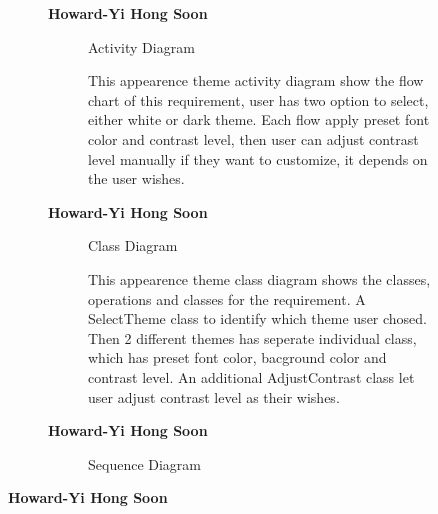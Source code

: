 \documentclass{article}
\begin{document}
		\begin{figure}[htbp]
			\textbf{Howard-Yi Hong Soon}
			\centering
			\begin{subfigure}{\textwidth}
				\resizebox{\textwidth}{!}{}
				\caption{Activity Diagram}
			\end{subfigure}
			\begin{subfigure}{\textwidth}
				This appearence theme activity diagram show the flow chart of this requirement, user has two option to select, either white or dark theme.
				Each flow apply preset font color and contrast level, then user can adjust contrast level manually if they want to customize, it depends on the 
				user wishes.
			\end{subfigure}
		\end{figure}
		

		\begin{figure}[htbp]
			\textbf{Howard-Yi Hong Soon}
			\centering
			\begin{subfigure}{\textwidth}
				\resizebox{\textwidth}{!}{}
				\caption{Class Diagram}
			\end{subfigure}
			\begin{subfigure}{\textwidth}
				This appearence theme class diagram shows the classes, operations and classes for the requirement. A SelectTheme class to identify
				which theme user chosed. Then 2 different themes has seperate individual class, which has preset font color, bacground color and 
				contrast level. An additional AdjustContrast class let user adjust contrast level as their wishes.
			\end{subfigure}
		\end{figure}
		

		\begin{figure}[htbp]
			\textbf{Howard-Yi Hong Soon}
			\centering
			\begin{subfigure}{\textwidth}
				\resizebox{\textwidth}{!}{}
				\caption{Sequence Diagram}
			\end{subfigure}
			\begin{subfigure}{\textwidth}
			\end{subfigure}
		\end{figure}
		\newpage

		\textbf{Howard-Yi Hong Soon}
\end{document}

